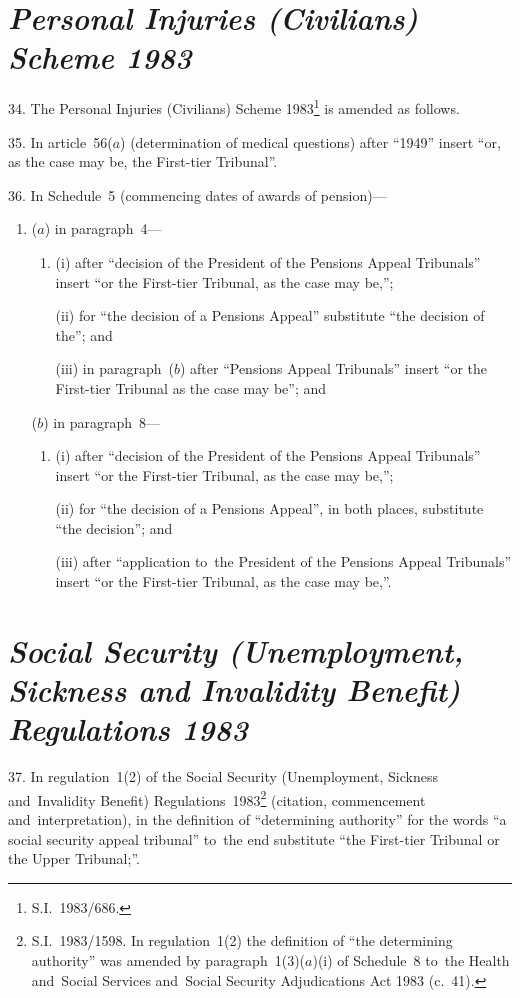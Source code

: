 \documentclass[12pt,a4paper]{article}
\begin{document}
\section*{\itshape Personal Injuries (Civilians) Scheme 1983}

34.  The Personal Injuries (Civilians) Scheme 1983\footnote{S.I.~1983/686.} is amended as follows.

\medskip

35.  In article~56($a$)  (determination of medical questions) after “1949” insert “or, as the case may be, the First-tier Tribunal”.

\medskip

36.  In Schedule~5 (commencing dates of awards of pension)—
\begin{enumerate}\item[]
($a$) in paragraph~4—
\begin{enumerate}\item[]
(i) after “decision of the President of the Pensions Appeal Tribunals” insert “or the First-tier Tribunal, as the case may be,”;

(ii) for “the decision of a Pensions Appeal” substitute “the decision of the”; and

(iii) in paragraph~($b$)  after “Pensions Appeal Tribunals” insert “or the First-tier Tribunal as the case may be”; and
\end{enumerate}

($b$) in paragraph~8—
\begin{enumerate}\item[]
(i) after “decision of the President of the Pensions Appeal Tribunals” insert “or the First-tier Tribunal, as the case may be,”;

(ii) for “the decision of a Pensions Appeal”, in both places, substitute “the decision”; and

(iii) after “application to~the President of the Pensions Appeal Tribunals” insert “or the First-tier Tribunal, as the case may be,”.
\end{enumerate}
\end{enumerate}

\section*{\itshape\sloppy{} Social Security (Unemployment, Sickness and Invalidity Benefit) Regulations 1983}

37.  In regulation~1(2) of the Social Security (Unemployment, Sickness and~Invalidity Benefit) Regulations~1983\footnote{S.I.~1983/1598. In regulation~1(2) the definition of “the determining authority” was amended by paragraph~1(3)($a$)(i) of Schedule~8 to~the Health and~Social Services and~Social Security Adjudications Act 1983 (c.~41).} (citation, commencement and~interpretation), in the definition of “determining authority” for the words “a social security appeal tribunal” to~the end substitute “the First-tier Tribunal or the Upper Tribunal;”.
\end{document}

